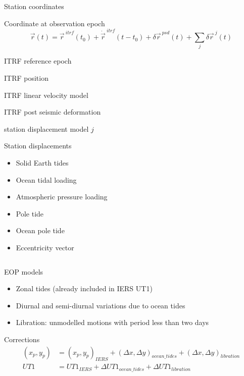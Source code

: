 \documentclass[14pt,table,t, c]{beamer}
\begin{document}
\begin{frame}{Station coordinates}
\begin{block}{Coordinate at observation epoch}
\vspace*{-\baselineskip}\setlength\belowdisplayskip{0pt}\setlength\abovedisplayskip{0pt}
\begin{equation*}
\vec{r}(t) = \vec{r}^{~itrf}(t_0) + \dot{\vec{r}}^{~itrf}(t - t_0) + \delta\vec{r}^{~psd}(t) +
\sum_j\delta\vec{r}^{~j}(t)
\end{equation*}
\end{block}
\begin{description}
\item[$t_0$] ITRF reference epoch 
\item[$\vec{r}^{~itrf}$] ITRF position
\item[$\dot{\vec{r}}^{~itrf}$] ITRF linear velocity model
\item[$\delta\vec{r}^{~psd}$] ITRF post seismic deformation
\item[$\delta\vec{r}^{~j}$] station displacement model $j$
\end{description}
\end{frame}

\begin{frame}{Station displacements}
\begin{itemize}
  \item Solid Earth tides
  \item Ocean tidal loading
  \item Atmospheric pressure loading
  \item Pole tide
  \item Ocean pole tide
  \item Eccentricity vector
\end{itemize}
\begin{equation*}
\end{equation*}
\end{frame}

\begin{frame}{EOP models}
\begin{itemize}
  \item Zonal tides (already included in IERS UT1)
  \item Diurnal and semi-diurnal variations due to ocean tides
  \item Libration: unmodelled motions with period less than two days 
\end{itemize}
\begin{block}{Corrections}
\small
\vspace*{-\baselineskip}\setlength\belowdisplayskip{0pt}\setlength\abovedisplayskip{0pt}
\begin{align*}
(x_p, y_p) &= (x_p, y_p)_{IERS} + (\Delta x,\Delta y)_{ocean\_tides} + (\Delta x, \Delta y)_{libration}\\
UT1 &= UT1_{IERS} + \Delta UT1_{ocean\_tides} + \Delta UT1_{libration}
\end{align*}
\end{block}
\end{frame}
\end{document}
